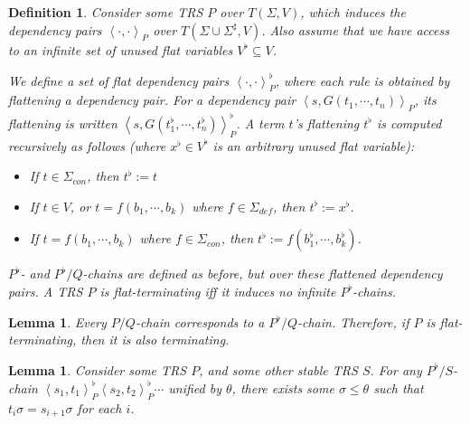 \documentclass{article}
\newtheorem{lemma}[theorem]{Lemma}
\newtheorem{definition}[theorem]{Definition}
\newcommand{\dpair}[2]{\left\langle #1, #2 \right\rangle}
\begin{document}
\begin{definition}
    Consider some TRS $P$ over $T(\Sigma, V)$, which induces the dependency pairs $\dpair{\cdot}{\cdot}_P$ over $T(\Sigma \cup \Sigma^\sharp, V)$. Also assume that we have access to an infinite set of unused \emph{flat variables} $V^\flat \subseteq V$.
    
    We define a set of \emph{flat dependency pairs} $\dpair{\cdot}{\cdot}^\flat_P$, where each rule is obtained by \emph{flattening} a dependency pair. For a dependency pair $\dpair{s}{G(t_1 , \cdots, t_n)}_P$, its flattening is written $\dpair{s}{G( t^\flat_1, \cdots, t_n^\flat)}^\flat_P$. A term $t$'s flattening $t^\flat$ is computed recursively as follows (where $x^\flat \in V^\flat$ is an arbitrary unused flat variable):
    \begin{itemize}
        \item If $t \in \Sigma_{con}$, then $t^\flat := t$
        \item If $t \in V$, or $t = f (b_1, \cdots, b_k)$ where $f \in \Sigma_{def}$, then $t^\flat := x^\flat$.
        \item If $t = f( b_1, \cdots, b_k)$ where $f \in \Sigma_{con}$, then $t^\flat := f( b^\flat_1, \cdots, b^\flat_k)$.
    \end{itemize} 
    $P^\flat$- and $P^\flat/Q$-chains are defined as before, but over these flattened dependency pairs. A TRS $P$ is \emph{flat-terminating} iff it induces no infinite $P^\flat$-chains. 
\end{definition}

\begin{lemma} \label{thm:flat_termination_overapprox}
    Every $P/Q$-chain corresponds to a $P^\flat/Q$-chain. Therefore, if $P$ is flat-terminating, then it is also terminating.
\end{lemma}

\begin{lemma} 
    Consider some TRS $P$, and some other stable TRS $S$. For any $P^\flat/S$-chain $\dpair{s_1}{t_1}^\flat_P \dpair{s_2}{t_2}^\flat_P \cdots$ unified by $\theta$, there exists some $\sigma \leq \theta$ such that $t_i \sigma = s_{i+1} \sigma$ for each $i$. 
\end{lemma}
\end{document}
